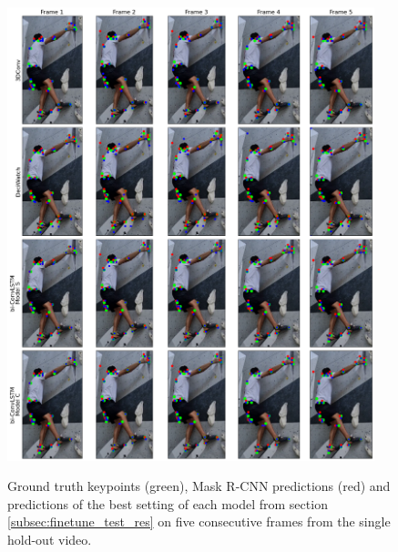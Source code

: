 \documentclass[./main.tex]{subfiles}
\begin{document}
\begin{figure}[h]
    \centering
    \includegraphics[width=0.95\textwidth]{./entities/predictions.png}
    \label{fig:predictions}
    \caption{Ground truth keypoints (green), Mask R-CNN predictions (red) and predictions of the best setting of each model from section \ref{subsec:finetune_test_res} on five consecutive frames from the single hold-out video.}
\end{figure}
\end{document}
